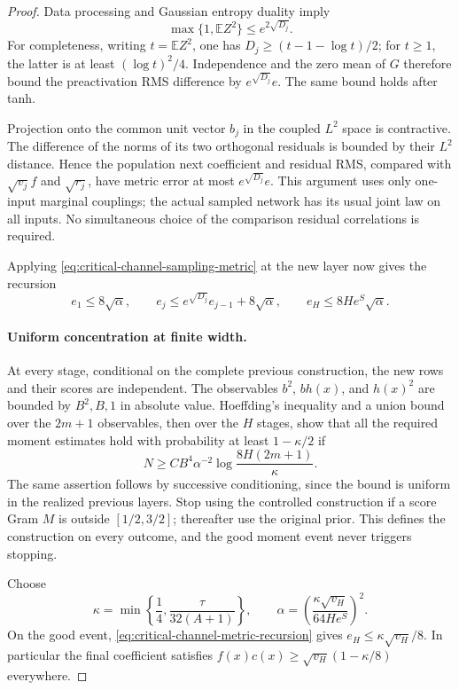 \begin{proof}
Data processing and Gaussian entropy duality imply
\[
 \max\{1,\mathbb E Z^2\}\le e^{2\sqrt{D_j}}.
\]
For completeness, writing $t=\mathbb E Z^2$, one has
$D_j\ge(t-1-\log t)/2$; for $t\ge1$, the latter is at least
$(\log t)^2/4$.  Independence and the zero mean of $G$ therefore
bound the preactivation RMS difference by $e^{\sqrt{D_j}}e$.
The same bound holds after tanh.

Projection onto the common unit vector $b_j$ in the coupled
$L^2$ space is contractive.  The difference of the norms of its two
orthogonal residuals is bounded by their $L^2$ distance.  Hence the
population next coefficient and residual RMS, compared with
$\sqrt{v_j}f$ and $\sqrt{r_j}$, have metric error at most
$e^{\sqrt{D_j}}e$.  This argument uses only one-input marginal
couplings; the actual sampled network has its usual joint law on all
inputs.  No simultaneous choice of the comparison residual correlations
is required.

Applying \eqref{eq:critical-channel-sampling-metric} at the new
layer now gives the recursion
\begin{equation}\label{eq:critical-channel-metric-recursion}
 e_1\le8\sqrt\alpha,\qquad
 e_j\le e^{\sqrt{D_j}}e_{j-1}+8\sqrt\alpha,
 \qquad e_H\le8H e^S\sqrt\alpha.
\end{equation}

\paragraph{Uniform concentration at finite width.}
At every stage, conditional on the complete previous construction,
the new rows and their scores are independent.  The observables
$b^2$, $bh(x)$, and $h(x)^2$ are bounded by $B^2,B,1$ in absolute
value.  Hoeffding's inequality and a union bound over the $2m+1$
observables, then over the $H$ stages, show that all the required
moment estimates hold with probability at least $1-\kappa/2$ if
\begin{equation}\label{eq:critical-channel-hoeffding}
 N\ge C B^4\alpha^{-2}\log\frac{8H(2m+1)}\kappa.
\end{equation}
The same assertion follows by successive conditioning, since the
bound is uniform in the realized previous layers.  Stop using the
controlled construction if a score Gram $M$ is outside $[1/2,3/2]$;
thereafter use the original prior.  This defines the construction on
every outcome, and the good moment event never triggers stopping.

Choose
\[
 \kappa=\min\left\{\frac14,\frac\tau{32(A+1)}\right\},\qquad
 \alpha=\left(\frac{\kappa\sqrt{v_H}}{64He^S}\right)^2.
\]
On the good event, \eqref{eq:critical-channel-metric-recursion} gives
$e_H\le\kappa\sqrt{v_H}/8$.  In particular the final coefficient
satisfies $f(x)c(x)\ge\sqrt{v_H}(1-\kappa/8)$ everywhere.


\end{proof}
